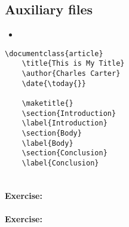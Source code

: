         \subsection{Auxiliary files}
        \label{Auxiliary files}
        
        \begin{framed}
            \begin{itemize}
                \item{}
            \end{itemize}
        \end{framed}


        \begin{verbatim}
\documentclass{article}
    \title{This is My Title}
    \author{Charles Carter}
    \date{\today{}}
 
    \maketitle{}
    \section{Introduction}
    \label{Introduction}
    \section{Body}
    \label{Body}
    \section{Conclusion}
    \label{Conclusion}
    
        \end{verbatim}

        \paragraph{Exercise:}

        \paragraph{Exercise:}


